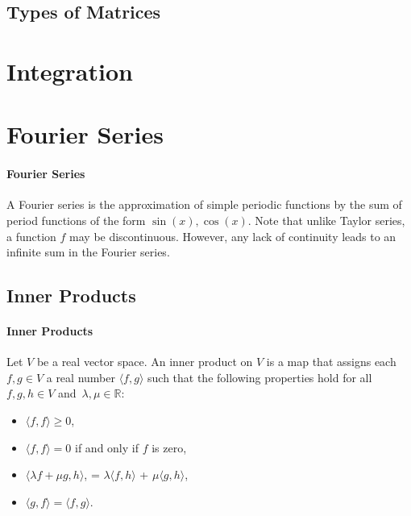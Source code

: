 \documentclass[12pt, letterpaper]{article}
\begin{document}
	\subsection{Types of Matrices}


    
    

    \section{Integration}


    \section{Fourier Series}
    \paragraph{Fourier Series}
    A Fourier series is the approximation of simple periodic functions by
    the sum of period functions of the form \(\sin(x), \cos(x)\).
    Note that unlike Taylor series, a function \(f\) may be discontinuous.
    However, any lack of continuity leads to an infinite sum in the Fourier series.
    
    \subsection{Inner Products}
    \paragraph{Inner Products}
    Let \(V\) be a real vector space. An inner product on \(V\) is a map
    that assigns each \(f,g\in V\) a real number \(\langle f, g \rangle\)
    such that the following properties hold for all \(f, g, h \in V\) and\
    \(\lambda, \mu \in \mathbb{R}\):
    \begin{itemize}
        \item \(\langle f, f \rangle \geq 0\),
        \item \(\langle f, f \rangle = 0\) if and only if \(f\) is zero,
        \item \(\langle \lambda f + \mu g, h\rangle\),
        = \(\lambda\langle f, h\rangle\) + \(\mu\langle g, h\rangle\),
        \item \(\langle g, f \rangle = \langle f, g \rangle\).
    \end{itemize}
\end{document}
